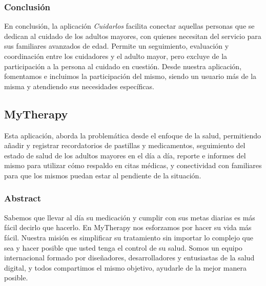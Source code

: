 \documentclass[a4paper,12pt]{article}
\begin{document}
    \subsubsection{Conclusión}
    En conclusión, la aplicación \textit{Cuidarlos} facilita conectar aquellas personas que se dedican al cuidado de los adultos mayores, con quienes necesitan del servicio para sus familiares avanzados de edad. Permite un seguimiento, evaluación y coordinación entre los cuidadores y el adulto mayor, pero excluye de la participación a la persona al cuidado en cuestión. Desde nuestra aplicación, fomentamos e incluimos la participación del mismo, siendo un usuario más de la misma y atendiendo sus necesidades específicas.

    \subsection{MyTherapy}
    Esta aplicación, aborda la problemática desde el enfoque de la salud, permitiendo añadir y registrar recordatorios de pastillas y medicamentos, seguimiento del estado de salud de los adultos mayores en el día a día, reporte e informes del mismo para utilizar cómo respaldo en citas médicas, y conectividad con familiares para que los mismos puedan estar al pendiente de la situación.
    \subsubsection{Abstract}
    Sabemos que llevar al día su medicación y cumplir con sus metas diarias es más fácil decirlo que hacerlo. En MyTherapy nos esforzamos por hacer su vida más fácil. Nuestra misión es simplificar su tratamiento sin importar lo complejo que sea y hacer posible que usted tenga el control de su salud. Somos un equipo internacional formado por diseñadores, desarrolladores y entusiastas de la salud digital, y todos compartimos el mismo objetivo, ayudarle de la mejor manera posible.
\end{document}
